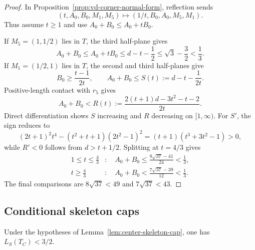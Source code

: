 \begin{proof}
In Proposition~\ref{prop:vd-corner-normal-form}, reflection sends
\[
 (t,A_0,B_0,M_1,M_5)
 \longmapsto(1/t,B_0,A_0,M_5,M_1).
\]
Thus assume $t\ge1$ and use $A_0+B_0\le A_0+tB_0$.

If $M_5=(1,1/2)$ lies in $T$, the third half-plane gives
\[
 A_0+B_0\le A_0+tB_0
 \le d-t-\frac12\le\sqrt3-\frac32<\frac13.
\]
If $M_1=(1/2,1)$ lies in $T$, the second and third half-planes give
\[
 B_0\ge\frac{t-1}{2t},
 \qquad A_0+B_0\le S(t):=d-t-\frac1{2t}.
\]
Positive-length contact with $r_5$ gives
\[
 A_0+B_0<R(t):=\frac{2(t+1)d-3t^2-t-2}{2t}.
\]
Direct differentiation shows $S$ increasing and $R$ decreasing on
$[1,\infty)$.  For $S'$, the sign reduces to
\[
 (2t+1)^2t^4-(t^2+t+1)(2t^2-1)^2
 =(t+1)(t^3+3t^2-1)>0,
\]
while $R'<0$ follows from $d>t+1/2$.  Splitting at $t=4/3$ gives
\[
\begin{aligned}
1\le t\le\frac43&:\quad
A_0+B_0\le\frac{8\sqrt{37}-41}{24}<\frac13,\\
t\ge\frac43&:\quad
A_0+B_0<\frac{7\sqrt{37}-39}{12}<\frac13.
\end{aligned}
\]
The final comparisons are $8\sqrt{37}<49$ and $7\sqrt{37}<43$.
\end{proof}


\subsection{Conditional skeleton caps}

\begin{lemma}
\label{lem:app-center-skeleton-cap-calculation}
Under the hypotheses of Lemma~\ref{lem:center-skeleton-cap}, one has
$L_S(T_C)<3/2$.
\end{lemma}

